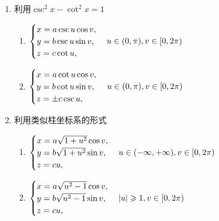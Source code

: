 \begin{solution}
\begin{enumerate}
        \item 利用$\csc^2x-\cot^2x=1$
        \begin{multicols}{2}
              \begin{enumerate}
            \item[单叶] 
            $\begin{cases}
                x=a\csc u\cos v,\\
                y=b\csc u\sin v,\\
                z=c\cot u,\\
            \end{cases}\\u\in(0,\pi),v\in[0,2\pi)$
            \item[双叶] 
            $\begin{cases}
                x=a\cot u\cos v,\\
                y=b\cot u\sin v,\\
                z=\pm c\csc u,\\
            \end{cases}\\u\in(0,\pi),v\in[0,2\pi)$
        \end{enumerate}
        \end{multicols}

        \item 利用类似柱坐标系的形式
        \begin{multicols}{2}
              \begin{enumerate}
            \item[单叶] 
            $\begin{cases}
                x=a\sqrt{1+u^2}\cos v,\\
                y=b\sqrt{1+u^2}\sin v,\\
                z=cu,\\
            \end{cases}\\u\in(-\infty,+\infty),v\in[0,2\pi)$
            \item[双叶] 
            $\begin{cases}
                x=a\sqrt{u^2-1}\cos v,\\
                y=b\sqrt{u^2-1}\sin v,\\
                z=cu,\\
            \end{cases}\\|u|\geqslant 1,v\in[0,2\pi)$
        \end{enumerate}
        \end{multicols}

    \end{enumerate}
\end{solution}


